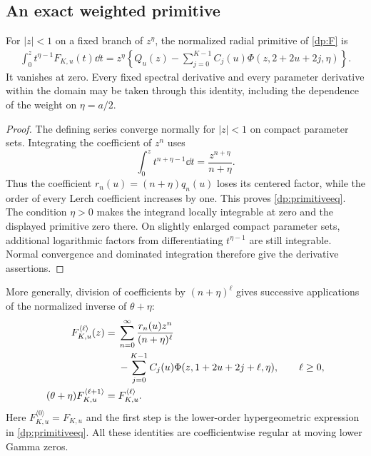 \subsection{An exact weighted primitive}
\begin{theorem}\label{dp:primitive}
For $|z|<1$ on a fixed branch of $z^\eta$, the normalized radial
primitive of \eqref{dp:F} is
\begin{align}
 \int_0^z t^{\eta-1}F_{K,u}(t)\dd t
  =z^\eta\left\{Q_u(z)-\sum_{j=0}^{K-1}
            C_j(u)\Phi(z,2+2u+2j,\eta)\right\}.
 \label{dp:primitiveeq}
\end{align}
It vanishes at zero. Every fixed spectral derivative and every
parameter derivative within the domain may be taken through this
identity, including the dependence of the weight on $\eta=a/2$.
\end{theorem}
\begin{proof}
The defining series converge normally for $|z|<1$ on compact parameter
sets. Integrating the coefficient of $z^n$ uses
\[
 \int_0^z t^{n+\eta-1}\dd t=\frac{z^{n+\eta}}{n+\eta}.
\]
Thus the coefficient $r_n(u)=(n+\eta)q_n(u)$ loses its centered
factor, while the order of every Lerch coefficient increases by one.
This proves \eqref{dp:primitiveeq}. The condition $\eta>0$ makes
the integrand locally integrable at zero and the displayed primitive
zero there. On slightly enlarged compact parameter sets, additional
logarithmic factors from differentiating $t^{\eta-1}$ are still
integrable. Normal convergence and dominated integration therefore
give the derivative assertions.
\end{proof}

More generally, division of coefficients by $(n+\eta)^\ell$ gives
successive applications of the normalized inverse of $\theta+\eta$:
\begin{align}
 F_{K,u}^{\langle\ell\rangle}(z)
 ={}&\sum_{n=0}^{\infty}
       \frac{r_n(u)z^n}{(n+\eta)^\ell}\notag\\
 &-\sum_{j=0}^{K-1}C_j(u)
            \Phi(z,1+2u+2j+\ell,\eta),\qquad \ell\ge0,
 \label{dp:ladder}\\
 (\theta+\eta)F_{K,u}^{\langle\ell+1\rangle}
 ={}&F_{K,u}^{\langle\ell\rangle}.
 \label{dp:ladderrec}
\end{align}
Here $F_{K,u}^{\langle0\rangle}=F_{K,u}$ and the first step is the
lower-order hypergeometric expression in \eqref{dp:primitiveeq}.
All these identities are coefficientwise regular at moving lower
Gamma zeros.

